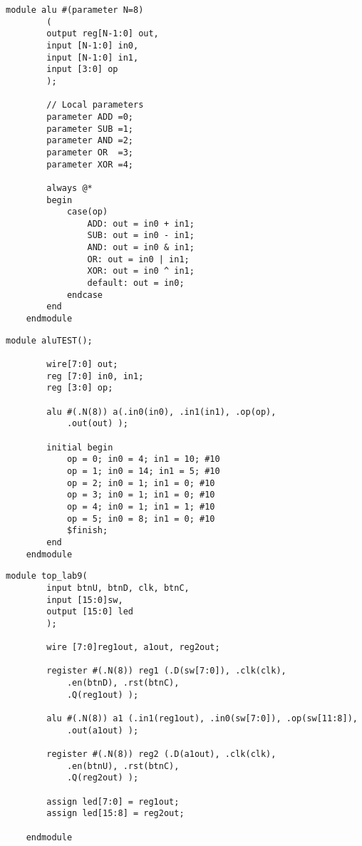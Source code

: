 \documentclass[11pt]{article}
\begin{document}
\clearpage
\begin{lstlisting}[style=Verilog,
caption=ALU Source Code,
label=MUX w/ four inputs Source Code
]
	module alu #(parameter N=8) 
		( 
		output reg[N-1:0] out,
		input [N-1:0] in0,
		input [N-1:0] in1,
		input [3:0] op 
		);
		
		// Local parameters
		parameter ADD =0; 
		parameter SUB =1; 
		parameter AND =2; 
		parameter OR  =3; 
		parameter XOR =4;
		
		always @* 
		begin 
			case(op)
				ADD: out = in0 + in1;
				SUB: out = in0 - in1;
				AND: out = in0 & in1;
				OR: out = in0 | in1;
				XOR: out = in0 ^ in1;
				default: out = in0;
			endcase
		end
	endmodule
\end{lstlisting}

\begin{lstlisting}[style=Verilog,
caption=ALU Test,
label=MUX4 Test
]
	module aluTEST();
	
		wire[7:0] out;
		reg [7:0] in0, in1;
		reg [3:0] op;
		
		alu #(.N(8)) a(.in0(in0), .in1(in1), .op(op),
			.out(out) );
		
		initial begin
			op = 0; in0 = 4; in1 = 10; #10			
			op = 1; in0 = 14; in1 = 5; #10			
			op = 2; in0 = 1; in1 = 0; #10			
			op = 3; in0 = 1; in1 = 0; #10
			op = 4; in0 = 1; in1 = 1; #10
			op = 5; in0 = 8; in1 = 0; #10
			$finish;  
		end          
	endmodule
\end{lstlisting}
\clearpage
\begin{lstlisting}[style=Verilog,
caption=Top Level Source Code,
label=Anode Decoder Source Code
]
	module top_lab9(
		input btnU, btnD, clk, btnC,
		input [15:0]sw,
		output [15:0] led
		);
	
		wire [7:0]reg1out, a1out, reg2out;
		
		register #(.N(8)) reg1 (.D(sw[7:0]), .clk(clk),
			.en(btnD), .rst(btnC),
			.Q(reg1out) ); 
		
		alu #(.N(8)) a1 (.in1(reg1out), .in0(sw[7:0]), .op(sw[11:8]),
			.out(a1out) ); 
		
		register #(.N(8)) reg2 (.D(a1out), .clk(clk),
			.en(btnU), .rst(btnC),
			.Q(reg2out) );
			
		assign led[7:0] = reg1out;
		assign led[15:8] = reg2out;
	
	endmodule
\end{lstlisting}
\end{document}
